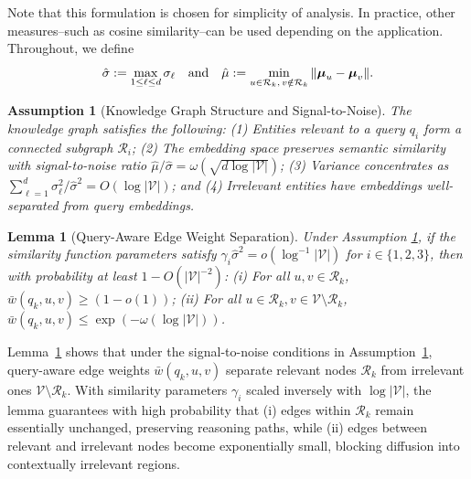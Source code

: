 \documentclass{article} %
\newtheorem{lemma}[theorem]{Lemma}
\newtheorem{assumption}{Assumption}
\begin{document}
Note that this formulation is chosen for simplicity of analysis. In practice, other measures--such as cosine similarity--can be used depending on the application. Throughout, we define
\begin{equation}
    \hat{\sigma} := \max_{1 \leq \ell \leq d} \sigma_\ell \quad \textnormal{and} \quad \hat{\mu} := \min_{u \in \mathcal{R}_k,\, v \notin \mathcal{R}_k} \|\boldsymbol{\mu}_u - \boldsymbol{\mu}_v\|.
\end{equation}

\begin{assumption}[Knowledge Graph Structure and Signal-to-Noise] \label{assump:snr}
The knowledge graph satisfies the following: 
(1) Entities relevant to a query $q_i$ form a connected subgraph $\mathcal{R}_i$; 
(2) The embedding space preserves semantic similarity with signal-to-noise ratio 
$\hat{\mu}/\hat{\sigma} = \omega(\sqrt{d \log|\mathcal{V}|})$; 
(3) Variance concentrates as $\sum_{\ell=1}^d \sigma_\ell^2 / \hat{\sigma}^2 = O(\log|\mathcal{V}|)$; 
and (4) Irrelevant entities have embeddings well-separated from query embeddings.
\end{assumption}

\begin{lemma}[Query-Aware Edge Weight Separation]\label{thm:edge-separation} 
Under Assumption \ref{assump:snr}, if the similarity function parameters satisfy $\gamma_i \hat{\sigma}^2 = o(\log^{-1} |\mathcal{V}|)$ for $i \in \{1,2,3\}$, then with probability at least $1 - O(|\mathcal{V}|^{-2})$:  
\textit{(i)} For all $u,v \in \mathcal{R}_k$, $\bar{w}(q_k, u, v) \geq (1 - o(1))$;  
\textit{(ii)} For all $u \in \mathcal{R}_k, v \in \mathcal{V} \setminus \mathcal{R}_k$, $\bar{w}(q_k, u, v) \leq \exp(-\omega(\log |\mathcal{V}|))$.
\end{lemma}

Lemma~\ref{thm:edge-separation} shows that under the signal-to-noise conditions in Assumption~\ref{assump:snr}, query-aware edge weights $\bar{w}(q_k, u, v)$ separate relevant nodes $\mathcal{R}_k$ from irrelevant ones $\mathcal{V}\setminus \mathcal{R}_k$. With similarity parameters $\gamma_i$ scaled inversely with $\log|\mathcal{V}|$, the lemma guarantees with high probability that (i) edges within $\mathcal{R}_k$ remain essentially unchanged, preserving reasoning paths, while (ii) edges between relevant and irrelevant nodes become exponentially small, blocking diffusion into contextually irrelevant regions.
\end{document}
